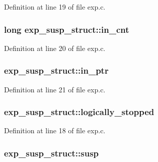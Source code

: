 Definition at line 19 of file exp.\+c.

\subsubsection[{\texorpdfstring{in\+\_\+cnt}{in_cnt}}]{\setlength{\rightskip}{0pt plus 5cm}long exp\+\_\+susp\+\_\+struct\+::in\+\_\+cnt}\hypertarget{structexp__susp__struct_ad99b87b846d82342e680005923bca849}{}\label{structexp__susp__struct_ad99b87b846d82342e680005923bca849}


Definition at line 20 of file exp.\+c.

\subsubsection[{\texorpdfstring{in\+\_\+ptr}{in_ptr}}]{ exp\+\_\+susp\+\_\+struct\+::in\+\_\+ptr}\hypertarget{structexp__susp__struct_a8a4fd3d5c63a1d9bfc29eb1462041609}{}\label{structexp__susp__struct_a8a4fd3d5c63a1d9bfc29eb1462041609}


Definition at line 21 of file exp.\+c.

\subsubsection[{\texorpdfstring{logically\+\_\+stopped}{logically_stopped}}]{ exp\+\_\+susp\+\_\+struct\+::logically\+\_\+stopped}\hypertarget{structexp__susp__struct_a29f5377a6e3ee4ba727313ab87bf021a}{}\label{structexp__susp__struct_a29f5377a6e3ee4ba727313ab87bf021a}


Definition at line 18 of file exp.\+c.

\subsubsection[{\texorpdfstring{susp}{susp}}]{ exp\+\_\+susp\+\_\+struct\+::susp}\hypertarget{structexp__susp__struct_a4ce803d6d2d7fd7e3b09c7b219affcdd}{}\label{structexp__susp__struct_a4ce803d6d2d7fd7e3b09c7b219affcdd}


